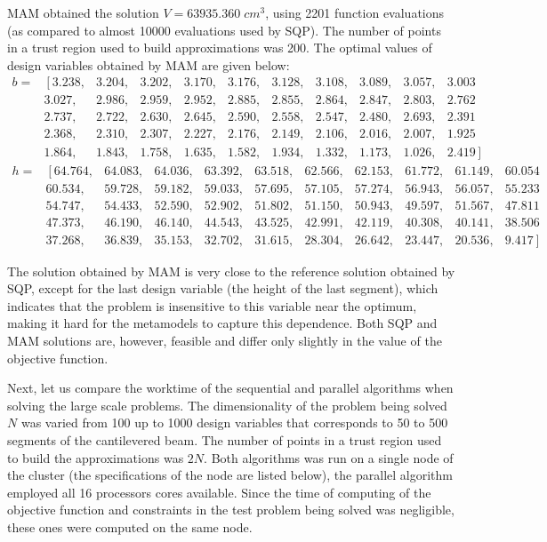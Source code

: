 \documentclass[runningheads,a4paper]{llncs}
\begin{document}
MAM obtained the solution $V = 63935.360\; cm^3$, using 2201 function evaluations (as compared to almost 10000 evaluations used by SQP). The number of points in a trust region used to build approximations was 200. The optimal values of design variables obtained by MAM are given below:
\[
\begin{matrix}
	b=&	\left[3.238,\right.&3.204,&3.202,&3.170,&3.176,&3.128,&3.108,&3.089,&3.057,&3.003 \\  
		& 3.027,&2.986,&2.959,&2.952,&2.885,&2.855,&2.864,&2.847,&2.803,&2.762 \\  
		& 2.737,&2.722,&2.630,&2.645,&2.590,&2.558,&2.547,&2.480,&2.693,&2.391 \\ 
		& 2.368,&2.310,&2.307,&2.227,&2.176,&2.149,&2.106,&2.016,&2.007,&1.925 \\  
		& 1.864,&1.843,&1.758,&1.635,&1.582,&1.934,&1.332,&1.173,&1.026,&\left.2.419\right]
\end{matrix}
\]
\[
\begin{matrix}
	h=& \left[64.764,\right.&64.083,&64.036,&63.392,&63.518,&62.566,&62.153,&61.772,&61.149,& 60.054  \\
		& 60.534,&59.728,&59.182,&59.033,&57.695,&57.105,&57.274,&56.943,&56.057,&55.233  \\
		& 54.747,&54.433,&52.590,&52.902,&51.802,&51.150,&50.943,&49.597,&51.567,&47.811  \\
		& 47.373,&46.190,&46.140,&44.543,&43.525,&42.991,&42.119,&40.308,&40.141,&38.506  \\
		& 37.268,&36.839,&35.153,&32.702,&31.615,&28.304,&26.642,&23.447,&20.536,& \left.9.417\right]
\end{matrix}
\]

The solution obtained by MAM is very close to the reference solution obtained by SQP, except for the last design variable (the height of the last segment), which indicates that the problem is insensitive to this variable near the optimum, making it hard for the metamodels to capture this dependence. Both SQP and MAM solutions are, however, feasible and differ only slightly in the value of the objective function.

Next, let us compare the worktime of the sequential and parallel algorithms when solving the large scale problems. 
The dimensionality of the problem being solved $N$ was varied from 100 up to 1000 design variables that corresponds to 50 to 500 segments of the cantilevered beam. The number of points in a trust region used to build the approximations was $2 N$. 
Both algorithms was run on a single node of the cluster (the specifications of the node are listed below), the parallel algorithm employed all 16 processors cores available. Since the time of computing of the objective 
function and constraints in the test problem being solved was negligible, these ones were computed on the same node.
\end{document}
